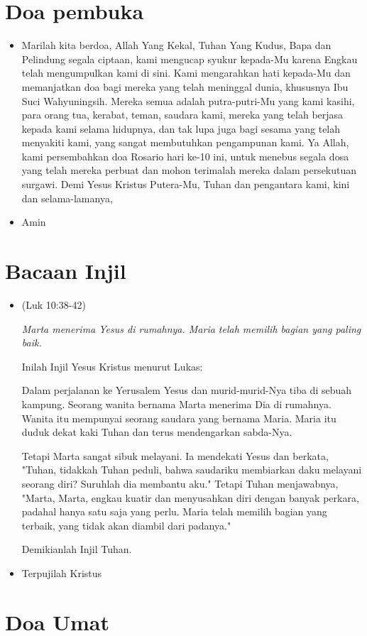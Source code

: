 \documentclass[a4paper, 12pt]{article}
\newcommand{\BU}[1]{\begin{itemize} \item[U:] #1 \end{itemize}}
\newcommand{\BP}[1]{\begin{itemize} \item[P:] #1 \end{itemize}}
\begin{document}
\setlength{\parindent}{0mm}

\section*{Doa pembuka}	
\BP{Marilah kita berdoa,
Allah Yang Kekal, Tuhan Yang Kudus,
Bapa dan Pelindung segala ciptaan,
kami mengucap syukur kepada-Mu
karena Engkau telah mengumpulkan kami di sini.
Kami mengarahkan hati kepada-Mu  dan memanjatkan doa
bagi mereka yang telah meninggal dunia,
khususnya Ibu Suci Wahyuningsih.
Mereka semua adalah putra-putri-Mu yang kami kasihi,
para orang tua, kerabat, teman, saudara kami,
mereka yang telah berjasa kepada kami selama hidupnya,
dan tak lupa juga bagi sesama yang telah menyakiti kami,
yang sangat membutuhkan pengampunan kami.
Ya Allah, kami persembahkan doa Rosario hari ke-10 ini, untuk menebus segala dosa yang telah mereka perbuat
dan mohon terimalah mereka dalam persekutuan surgawi.
Demi Yesus Kristus Putera-Mu, Tuhan dan pengantara kami, kini dan selama-lamanya,}

\BU{Amin}

\section*{Bacaan Injil}

\BP{(Luk 10:38-42)

\textit{Marta menerima Yesus di rumahnya.  
Maria telah memilih bagian yang paling baik.
}

Inilah Injil Yesus Kristus menurut Lukas:

Dalam perjalanan ke Yerusalem 
Yesus dan murid-murid-Nya tiba di sebuah kampung. 
Seorang wanita bernama Marta menerima Dia di rumahnya.
Wanita itu mempunyai seorang saudara yang bernama Maria. 
Maria itu duduk dekat kaki Tuhan 
dan terus mendengarkan sabda-Nya.

Tetapi Marta sangat sibuk melayani. 
Ia mendekati Yesus dan berkata, 
"Tuhan, tidakkah Tuhan peduli, 
bahwa saudariku membiarkan daku melayani seorang diri? 
Suruhlah dia membantu aku."
Tetapi Tuhan menjawabnya, 
"Marta, Marta, 
engkau kuatir dan menyusahkan diri dengan banyak perkara,
padahal hanya satu saja yang perlu. 
Maria telah memilih bagian yang terbaik, 
yang tidak akan diambil dari padanya."

Demikianlah Injil Tuhan.}

\BU{Terpujilah Kristus}

\section*{Doa Umat}
\end{document}
